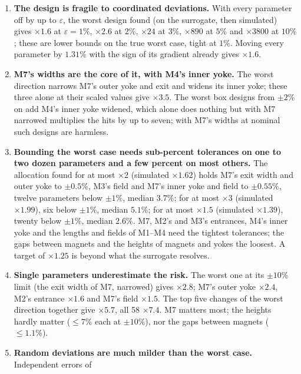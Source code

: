 \documentclass[11pt,a4paper]{article}
\begin{document}
\begin{enumerate}
  \item \textbf{The design is fragile to coordinated deviations.} With every parameter off by up
        to $\varepsilon$, the worst design found (on the surrogate, then simulated) gives
        $\times1.6$ at $\varepsilon=1\%$, $\times2.6$ at $2\%$, $\times24$ at $3\%$, $\times890$
        at $5\%$ and $\times3800$ at $10\%$; these are lower bounds on the true worst case,
        tight at $1\%$. Moving every parameter by $1.31\%$ with the sign of its gradient
        already gives $\times1.6$.
  \item \textbf{M7's widths are the core of it, with M4's inner yoke.} The worst direction narrows
        M7's outer yoke and exit and widens its inner yoke; these three alone at their scaled
        values give $\times3.5$. The worst box designs from $\pm2\%$ on add M4's inner yoke widened,
        which alone does nothing but with M7 narrowed multiplies the hits by up to seven; with
        M7's widths at nominal such designs are harmless.
  \item \textbf{Bounding the worst case needs sub-percent tolerances on one to two dozen parameters
        and a few percent on most others.} The allocation found for at most $\times2$
        (simulated $\times1.62$) holds M7's exit width and outer yoke to $\pm0.5\%$, M3's field
        and M7's inner yoke and field to $\pm0.55\%$, twelve parameters below $\pm1\%$, median
        $3.7\%$; for at most $\times3$ (simulated $\times1.99$), six below $\pm1\%$, median
        $5.1\%$; for at most $\times1.5$ (simulated $\times1.39$), twenty below $\pm1\%$, median
        $2.6\%$. M7, M2's and M3's entrances, M4's inner yoke and the lengths and fields of M1--M4
        need the tightest tolerances; the gaps between magnets and the heights of magnets and
        yokes the loosest. A target of $\times1.25$ is beyond what the surrogate resolves.
  \item \textbf{Single parameters underestimate the risk.} The worst one at its $\pm10\%$ limit
        (the exit width of M7, narrowed) gives $\times2.8$; M7's outer yoke $\times2.4$, M2's
        entrance $\times1.6$ and M7's field $\times1.5$. The top five changes of the worst
        direction together give $\times5.7$, all 58 $\times7.4$. M7 matters most; the heights
        hardly matter ($\le7\%$ each at $\pm10\%$), nor the gaps between magnets ($\le1.1\%$).
  \item \textbf{Random deviations are much milder than the worst case.} Independent errors of

\end{enumerate}
\end{document}
